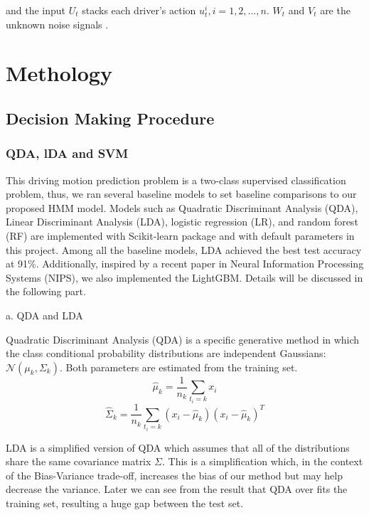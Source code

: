 \documentclass[conference]{IEEEtran}
\begin{document}
and the input $U_{t}$ stacks each driver's action $u_{t}^{i}, i = 1, 2, \dots, n$. $W_t$ and $V_t$ are the unknown noise signals .




\section{Methology}
\subsection{Decision Making Procedure}
\subsubsection{QDA, lDA and SVM}
This driving motion prediction problem is a two-class supervised classification problem, thus, we ran several baseline models to set baseline comparisons to our proposed HMM model. Models such as Quadratic Discriminant Analysis (QDA), Linear Discriminant Analysis (LDA), logistic regression (LR), and random forest (RF) are implemented with Scikit-learn package \cite{QIS1} and with default parameters in this project. Among all the baseline models, LDA achieved the best test accuracy at 91\%. Additionally, inspired by a recent paper in Neural Information Processing Systems (NIPS), we also implemented the LightGBM. Details will be discussed in the following part.

a. QDA and LDA

Quadratic Discriminant Analysis (QDA) is a specific generative method in which the class conditional probability distributions are independent Gaussians: $\mathcal{N} (\mu_k, \Sigma_k)$. Both parameters are estimated from the training set.
\begin{equation}
\hat{\mu}_k=\frac{1}{n_k}\sum_{t_i=k}x_i
\end{equation}
\begin{equation}
\hat{\Sigma}_k=\frac{1}{n_k}\sum_{t_i=k}(x_i-\hat{\mu}_k)(x_i-\hat{\mu}_k)^T
\end{equation}

LDA is a simplified version of QDA which assumes that all of the distributions share the same covariance matrix $\Sigma$. This is a simplification which, in the context of the Bias-Variance trade-off, increases the bias of our method but may help decrease the variance. Later we can see from the result that QDA over fits the training set, resulting a huge gap between the test set. 
\end{document}
